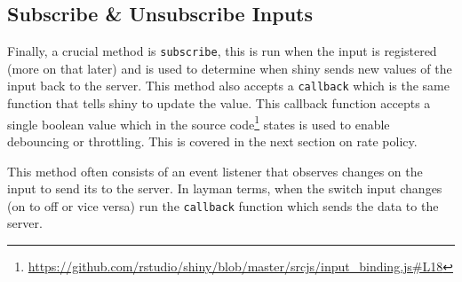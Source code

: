 \documentclass[
  10pt,
]{krantz}
\renewcommand{\href}[2]{#2\footnote{\url{#1}}}
\begin{document}
\hypertarget{shiny-input-sub-unsub}{%
\subsection{Subscribe \& Unsubscribe Inputs}\label{shiny-input-sub-unsub}}

Finally, a crucial method is \texttt{subscribe}, this is run when the input is registered (more on that later) and is used to determine when shiny sends new values of the input back to the server. This method also accepts a \texttt{callback} which is the same function that tells shiny to update the value. This callback function accepts a single boolean value which in the \href{https://github.com/rstudio/shiny/blob/master/srcjs/input_binding.js\#L18}{source code} states is used to enable debouncing or throttling. This is covered in the next section on rate policy.

This method often consists of an event listener that observes changes on the input to send its to the server. In layman terms, when the switch input changes (on to off or vice versa) run the \texttt{callback} function which sends the data to the server.
\end{document}
